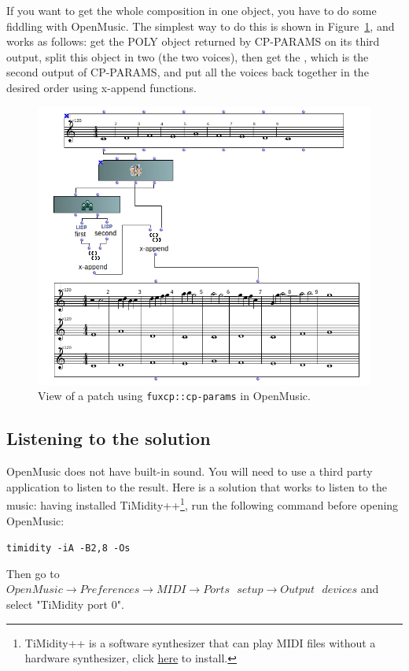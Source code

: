 If you want to get the whole composition in one object, you have to do some fiddling with OpenMusic. The simplest way to do this is shown in Figure~\ref{fig:om_ext_interface_mod}, and works as follows: get the POLY object returned by CP-PARAMS on its third output, split this object in two (the two voices), then get the \cfs, which is the second output of CP-PARAMS, and put all the voices back together in the desired order using x-append functions. 

\begin{figure}[h]
  \centering
  \includegraphics[width=5.2in]{Images/om_ext_interface_mod.png}
  \caption{View of a patch using \texttt{fuxcp::cp-params} in OpenMusic.}
  \label{fig:om_ext_interface_mod}
\end{figure}


\subsection*{Listening to the solution}
OpenMusic does not have built-in sound. You will need to use a third party application to listen to the result. Here is a solution that works to listen to the music: having installed TiMidity++\footnote{TiMidity++ is a software synthesizer that can play MIDI files without a hardware synthesizer, click \href{https://timidity.sourceforge.net/}{here} to install.}, run the following command before opening OpenMusic:


\texttt{timidity -iA -B2,8 -Os}


Then go to $\mathit{OpenMusic} \to \mathit{Preferences} \to  \mathit{MIDI} \to \mathit{Ports\text{ }setup} \to \mathit{Output\text{ }devices}$ and select "TiMidity port 0".


